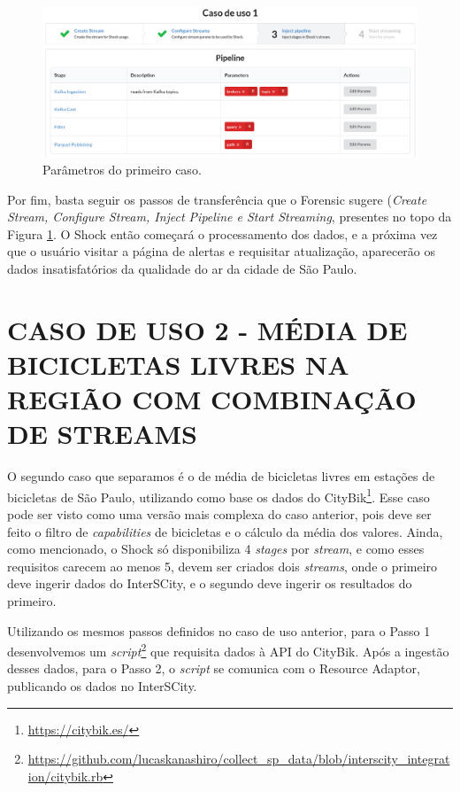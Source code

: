\begin{figure}
  \centering
  \includegraphics[width=\textwidth]{figuras/parametros.png}
  \caption{Parâmetros do primeiro caso.}
  \label{fig:case1}
\end{figure}

Por fim, basta seguir os passos de transferência que o Forensic sugere (\textit{Create
Stream, Configure Stream, Inject Pipeline e Start Streaming}, presentes no
topo da Figura \ref{fig:case1}. O Shock então começará o processamento dos
dados, e a próxima vez que o usuário visitar a página de alertas e requisitar
atualização, aparecerão os dados insatisfatórios da qualidade do ar da cidade
de São Paulo.

\section{CASO DE USO 2 - MÉDIA DE BICICLETAS LIVRES NA REGIÃO COM COMBINAÇÃO DE STREAMS}

O segundo caso que separamos é o de média de bicicletas livres em estações
de bicicletas de São Paulo, utilizando como base os dados do
CityBik\footnote{\url{https://citybik.es/}}. Esse caso pode ser visto como uma
versão mais complexa do caso anterior, pois deve ser feito o filtro de
\textit{capabilities} de bicicletas e o cálculo da média dos valores. Ainda,
como mencionado, o Shock só disponibiliza 4 \textit{stages} por
\textit{stream}, e como esses requisitos carecem ao menos 5, devem ser criados
dois \textit{streams}, onde o primeiro deve ingerir dados do InterSCity, e o
segundo deve ingerir os resultados do primeiro.

Utilizando os mesmos passos definidos no caso de uso anterior, para o Passo 1
desenvolvemos um
\textit{script}\footnote{\url{https://github.com/lucaskanashiro/collect_sp_data/blob/interscity_integration/citybik.rb}}
que requisita dados à API do CityBik. Após a ingestão desses dados, para o 
Passo 2, o
\textit{script} se comunica com o Resource Adaptor, publicando os dados no
InterSCity.


